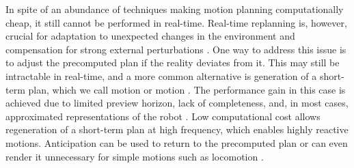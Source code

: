 In spite of an abundance of techniques making motion planning computationally
cheap, it still cannot be performed in real-time. Real-time replanning is,
however, crucial for adaptation to unexpected changes in the environment and
compensation for strong external perturbations \cite{Nishiwaki2009ijrr}. One
way to address this issue is to adjust the precomputed plan if the reality
deviates from it. This may still be intractable in real-time, and a more common
alternative is generation of a short-term plan, which we call motion
 or motion . The performance gain in this case is
achieved due to limited preview horizon, lack of completeness, and, in most
cases, approximated representations of the robot \cite{Kajita2003icra,
Nagasaka2012, Audren2014iros, Nishiwaki2009ijrr}. Low computational cost allows
regeneration of a short-term plan at high frequency, which enables highly
reactive motions. Anticipation can be used to return to the precomputed plan or
can even render it unnecessary for simple motions such as locomotion
\cite{Azevedo2002icra, Wieber2006humanoids, Herdt2010auro, Tassa2014icra,
Sherikov2014humanoids}.


